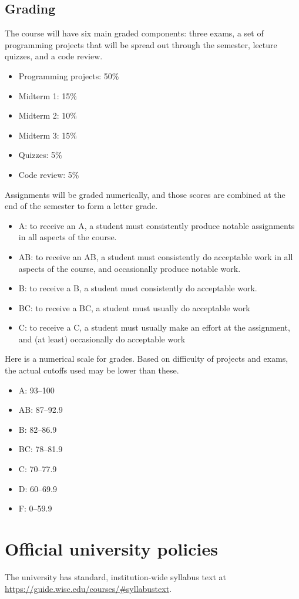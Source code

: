 \subsection*{Grading}
The course will have six main graded components: three exams, a set of
programming projects that will be spread out through the semester, lecture
quizzes, and a code review.

\begin{itemize}
  \item Programming projects: 50\%
  \item Midterm 1: 15\%
  \item Midterm 2: 10\%
  \item Midterm 3: 15\%
  \item Quizzes: 5\%
  \item Code review: 5\%
\end{itemize}

Assignments will be graded numerically, and those scores are combined at the end of the semester to form a letter
grade.
\begin{itemize}
  \item A: to receive an A, a student must consistently produce notable assignments in all aspects of the course.
  \item AB: to receive an AB, a student must consistently do acceptable work in all aspects of the course, and occasionally produce notable
        work.
  \item B: to receive a B, a student must consistently do acceptable work.
  \item BC: to receive a BC, a student must usually do acceptable work
  \item C: to receive a C, a student must usually make an effort at the assignment, and (at least) occasionally do acceptable work
\end{itemize}

Here is a numerical scale for grades. Based on difficulty of projects and exams, the actual cutoffs used may be lower
than these.

\begin{itemize}
  \item A: 93--100
  \item AB: 87--92.9
  \item B: 82--86.9
  \item BC: 78--81.9
  \item C: 70--77.9
  \item D: 60--69.9
  \item F: 0--59.9
\end{itemize}

\section*{Official university policies}

The university has standard, institution-wide syllabus text at
\url{https://guide.wisc.edu/courses/#syllabustext}.
